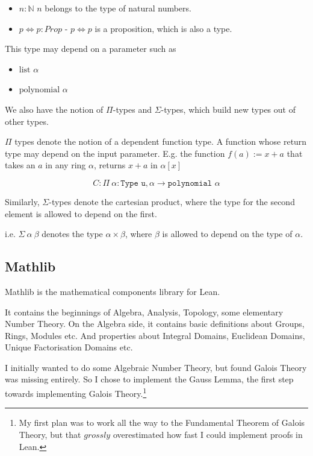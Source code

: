 \documentclass[pagesize=a4]{scrreprt}
\newcommand{\N}{\mathbb{N}}
\begin{document}
\begin{itemize}
    \item $n : \N$ $n$ belongs to the type of natural numbers. 
    \item $p \iff  p : Prop$ - $p \iff p$ is a proposition, which is also a type. 
\end{itemize}

This type may depend on a parameter such as 

\begin{itemize}
  \item $\text{list } \alpha$
  \item $\text{polynomial } \alpha$
\end{itemize}

We also have the notion of $\Pi$-types and $\Sigma$-types, which build new types out of other types. 

$\Pi$ types denote the notion of a dependent function type. A function whose return type may depend on the input parameter. E.g. the function $f(a) := x + a$ that takes an $a$ in any ring $\alpha$, returns $x + a$ in $\alpha[x]$

$$C :\Pi\ \alpha : \texttt{Type u}, \alpha \rightarrow \texttt{polynomial } \alpha $$

Similarly, $\Sigma$-types denote the cartesian product, where the type for the second element is allowed to depend on the first. 

i.e. $\Sigma\ \alpha\ \beta$ denotes the type $\alpha \times \beta$, where $\beta$ is allowed to depend on the type of $ \alpha$. 

\subsection{Mathlib}

Mathlib is the mathematical components library for Lean. 

It contains the beginnings of Algebra, Analysis, Topology, some elementary Number Theory. On the Algebra side, it contains basic definitions about Groups, Rings, Modules etc. And properties about Integral Domains, Euclidean Domains, Unique Factorisation Domains etc. 

I initially wanted to do some Algebraic Number Theory, but found Galois Theory was missing entirely. So I chose to implement the Gauss Lemma, the first step towards implementing Galois Theory.\footnote{My first plan was to work all the way to the Fundamental Theorem of Galois Theory, but that $grossly$ overestimated how fast I could implement proofs in Lean.} 
\end{document}
